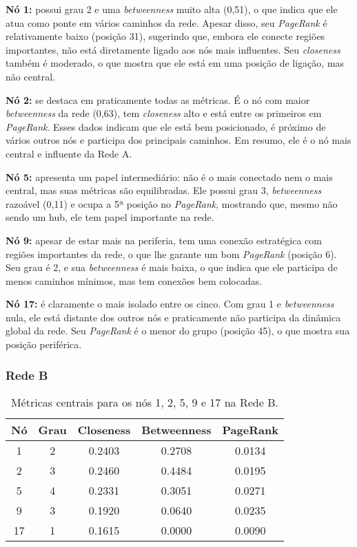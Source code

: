 \documentclass[a4paper]{article}
\begin{document}
\textbf{Nó 1:} possui grau 2 e uma \textit{betweenness} muito alta (0{,}51), o que indica que ele atua como ponte em vários caminhos da rede. Apesar disso, seu \textit{PageRank} é relativamente baixo (posição 31), sugerindo que, embora ele conecte regiões importantes, não está diretamente ligado aos nós mais influentes. Seu \textit{closeness} também é moderado, o que mostra que ele está em uma posição de ligação, mas não central.

\textbf{Nó 2:} se destaca em praticamente todas as métricas. É o nó com maior \textit{betweenness} da rede (0{,}63), tem \textit{closeness} alto e está entre os primeiros em \textit{PageRank}. Esses dados indicam que ele está bem posicionado, é próximo de vários outros nós e participa dos principais caminhos. Em resumo, ele é o nó mais central e influente da Rede A.

\textbf{Nó 5:} apresenta um papel intermediário: não é o mais conectado nem o mais central, mas suas métricas são equilibradas. Ele possui grau 3, \textit{betweenness} razoável (0{,}11) e ocupa a 5ª posição no \textit{PageRank}, mostrando que, mesmo não sendo um hub, ele tem papel importante na rede.

\textbf{Nó 9:} apesar de estar mais na periferia, tem uma conexão estratégica com regiões importantes da rede, o que lhe garante um bom \textit{PageRank} (posição 6). Seu grau é 2, e sua \textit{betweenness} é mais baixa, o que indica que ele participa de menos caminhos mínimos, mas tem conexões bem colocadas.

\textbf{Nó 17:} é claramente o mais isolado entre os cinco. Com grau 1 e \textit{betweenness} nula, ele está distante dos outros nós e praticamente não participa da dinâmica global da rede. Seu \textit{PageRank} é o menor do grupo (posição 45), o que mostra sua posição periférica.

\subsubsection{Rede B}

\begin{table}[h]
\centering
\begin{tabular}{|c|c|c|c|c|}
\hline
\textbf{Nó} & \textbf{Grau} & \textbf{Closeness} & \textbf{Betweenness} & \textbf{PageRank} \\
\hline
1  & 2 & 0.2403 & 0.2708 & 0.0134 \\
2  & 3 & 0.2460 & 0.4484 & 0.0195 \\
5  & 4 & 0.2331 & 0.3051 & 0.0271 \\
9  & 3 & 0.1920 & 0.0640 & 0.0235 \\
17 & 1 & 0.1615 & 0.0000 & 0.0090 \\
\hline
\end{tabular}
\caption{Métricas centrais para os nós 1, 2, 5, 9 e 17 na Rede B.}
\end{table}
\end{document}
